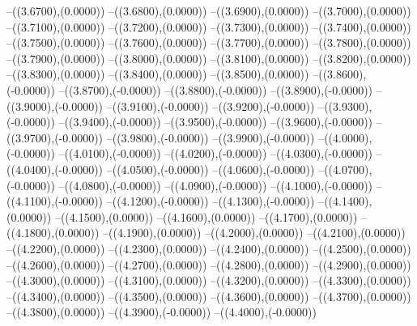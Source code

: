 {	--({\sx*(3.6700)},{\sy*(0.0000)})
	--({\sx*(3.6800)},{\sy*(0.0000)})
	--({\sx*(3.6900)},{\sy*(0.0000)})
	--({\sx*(3.7000)},{\sy*(0.0000)})
	--({\sx*(3.7100)},{\sy*(0.0000)})
	--({\sx*(3.7200)},{\sy*(0.0000)})
	--({\sx*(3.7300)},{\sy*(0.0000)})
	--({\sx*(3.7400)},{\sy*(0.0000)})
	--({\sx*(3.7500)},{\sy*(0.0000)})
	--({\sx*(3.7600)},{\sy*(0.0000)})
	--({\sx*(3.7700)},{\sy*(0.0000)})
	--({\sx*(3.7800)},{\sy*(0.0000)})
	--({\sx*(3.7900)},{\sy*(0.0000)})
	--({\sx*(3.8000)},{\sy*(0.0000)})
	--({\sx*(3.8100)},{\sy*(0.0000)})
	--({\sx*(3.8200)},{\sy*(0.0000)})
	--({\sx*(3.8300)},{\sy*(0.0000)})
	--({\sx*(3.8400)},{\sy*(0.0000)})
	--({\sx*(3.8500)},{\sy*(0.0000)})
	--({\sx*(3.8600)},{\sy*(-0.0000)})
	--({\sx*(3.8700)},{\sy*(-0.0000)})
	--({\sx*(3.8800)},{\sy*(-0.0000)})
	--({\sx*(3.8900)},{\sy*(-0.0000)})
	--({\sx*(3.9000)},{\sy*(-0.0000)})
	--({\sx*(3.9100)},{\sy*(-0.0000)})
	--({\sx*(3.9200)},{\sy*(-0.0000)})
	--({\sx*(3.9300)},{\sy*(-0.0000)})
	--({\sx*(3.9400)},{\sy*(-0.0000)})
	--({\sx*(3.9500)},{\sy*(-0.0000)})
	--({\sx*(3.9600)},{\sy*(-0.0000)})
	--({\sx*(3.9700)},{\sy*(-0.0000)})
	--({\sx*(3.9800)},{\sy*(-0.0000)})
	--({\sx*(3.9900)},{\sy*(-0.0000)})
	--({\sx*(4.0000)},{\sy*(-0.0000)})
	--({\sx*(4.0100)},{\sy*(-0.0000)})
	--({\sx*(4.0200)},{\sy*(-0.0000)})
	--({\sx*(4.0300)},{\sy*(-0.0000)})
	--({\sx*(4.0400)},{\sy*(-0.0000)})
	--({\sx*(4.0500)},{\sy*(-0.0000)})
	--({\sx*(4.0600)},{\sy*(-0.0000)})
	--({\sx*(4.0700)},{\sy*(-0.0000)})
	--({\sx*(4.0800)},{\sy*(-0.0000)})
	--({\sx*(4.0900)},{\sy*(-0.0000)})
	--({\sx*(4.1000)},{\sy*(-0.0000)})
	--({\sx*(4.1100)},{\sy*(-0.0000)})
	--({\sx*(4.1200)},{\sy*(-0.0000)})
	--({\sx*(4.1300)},{\sy*(-0.0000)})
	--({\sx*(4.1400)},{\sy*(0.0000)})
	--({\sx*(4.1500)},{\sy*(0.0000)})
	--({\sx*(4.1600)},{\sy*(0.0000)})
	--({\sx*(4.1700)},{\sy*(0.0000)})
	--({\sx*(4.1800)},{\sy*(0.0000)})
	--({\sx*(4.1900)},{\sy*(0.0000)})
	--({\sx*(4.2000)},{\sy*(0.0000)})
	--({\sx*(4.2100)},{\sy*(0.0000)})
	--({\sx*(4.2200)},{\sy*(0.0000)})
	--({\sx*(4.2300)},{\sy*(0.0000)})
	--({\sx*(4.2400)},{\sy*(0.0000)})
	--({\sx*(4.2500)},{\sy*(0.0000)})
	--({\sx*(4.2600)},{\sy*(0.0000)})
	--({\sx*(4.2700)},{\sy*(0.0000)})
	--({\sx*(4.2800)},{\sy*(0.0000)})
	--({\sx*(4.2900)},{\sy*(0.0000)})
	--({\sx*(4.3000)},{\sy*(0.0000)})
	--({\sx*(4.3100)},{\sy*(0.0000)})
	--({\sx*(4.3200)},{\sy*(0.0000)})
	--({\sx*(4.3300)},{\sy*(0.0000)})
	--({\sx*(4.3400)},{\sy*(0.0000)})
	--({\sx*(4.3500)},{\sy*(0.0000)})
	--({\sx*(4.3600)},{\sy*(0.0000)})
	--({\sx*(4.3700)},{\sy*(0.0000)})
	--({\sx*(4.3800)},{\sy*(0.0000)})
	--({\sx*(4.3900)},{\sy*(-0.0000)})
	--({\sx*(4.4000)},{\sy*(-0.0000)})
}
